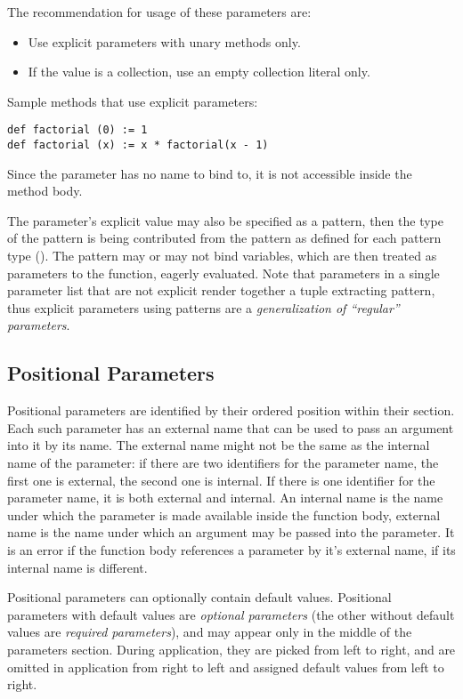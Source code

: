 The recommendation for usage of these parameters are: 
\begin{itemize}
  \item Use explicit parameters with unary methods only. 
  \item If the value is a collection, use an empty collection literal only. 
\end{itemize}

\example Sample methods that use explicit parameters:
\begin{lstlisting}
def factorial (0) := 1
def factorial (x) := x * factorial(x - 1)
\end{lstlisting}

Since the parameter has no name to bind to, it is not accessible inside the method body. 

The parameter's explicit value may also be specified as a pattern, then the type of the pattern is being contributed from the pattern as defined for each pattern type (). The pattern may or may not bind variables, which are then treated as parameters to the function, eagerly evaluated. Note that parameters in a single parameter list that are not explicit render together a tuple extracting pattern, thus explicit parameters using patterns are a {\em generalization of ``regular'' parameters}. 





\subsection{Positional Parameters}
\label{sec:positional-parameters}

Positional parameters are identified by their ordered position within their section. Each such parameter has an external name that can be used to pass an argument into it by its name. The external name might not be the same as the internal name of the parameter: if there are two identifiers for the parameter name, the first one is external, the second one is internal. If there is one identifier for the parameter name, it is both external and internal. An internal name is the name under which the parameter is made available inside the function body, external name is the name under which an argument may be passed into the parameter. It is an error if the function body references a parameter by it's external name, if its internal name is different. 

Positional parameters can optionally contain default values. Positional parameters with default values are {\em optional parameters} (the other without default values are {\em required parameters}), and may appear only in the middle of the parameters section. During application, they are picked from left to right, and are omitted in application from right to left and assigned default values from left to right.

